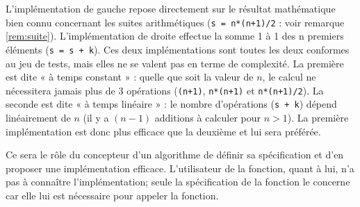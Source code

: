 L'implémentation de gauche repose directement sur le résultat
mathématique bien connu concernant les suites arithmétiques 
({\tt s = n*(n+1)/2} : voir remarque \ref{rem:suite}).
L'implémentation de droite effectue la somme 1 à 1 des n premiers éléments ({\tt s = s + k}).
Ces deux implémentations sont toutes les deux conformes au jeu de tests, mais elles 
ne se valent pas en terme de complexité. La première est dite « à temps constant » : 
quelle que soit la valeur de $n$, le calcul ne nécessitera jamais plus de 3 opérations 
({\tt (n+1)}, {\tt n*(n+1)} et {\tt n*(n+1)/2}). La seconde est dite « à temps linéaire » :
le nombre d'opérations ({\tt s + k}) dépend linéairement de $n$ (il y a $(n-1)$ additions à calculer
pour $n>1$). La première implémentation est donc plus efficace que la deuxième et lui sera préférée.

Ce sera le rôle du concepteur d'un algorithme de définir 
sa spécification et d'en proposer une implémentation efficace.
L'utilisateur de la fonction, quant à lui, n'a pas à connaître
l'implémen\-ta\-tion; seule la spécification de la fonction le concerne
car elle lui est nécessaire pour appeler la fonction.

